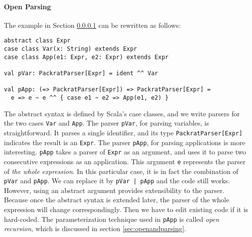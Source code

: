 \paragraph{Open Parsing}
The example in Section \ref{} can be rewritten as follows:

\begin{lstlisting}
abstract class Expr
case class Var(x: String) extends Expr
case class App(e1: Expr, e2: Expr) extends Expr

val pVar: PackratParser[Expr] = ident ^^ Var

val pApp: (=> PackratParser[Expr]) => PackratParser[Expr] =
  e => e ~ e ^^ { case e1 ~ e2 => App(e1, e2) }
\end{lstlisting}

The abstract syntax is defined by Scala's case classes, and 
we write parsers for the two cases \lstinline{Var} and \lstinline{App}.
The parser \lstinline{pVar}, for parsing variables, is straightforward. It parses a
single identifier, and its type \lstinline{PackratParser[Expr]}
indicates the result is an \lstinline{Expr}.
The parser \lstinline{pApp}, for parsing applications is more
interesting. \lstinline{pApp} takes a parser of
\lstinline{Expr} as an argument, and uses it to parse two consecutive
expressions as an application. This argument \lstinline{e} represents
the parser of \emph{the whole expression}. In this particular case, it
is in fact the combination of \lstinline{pVar} and
\lstinline{pApp}. We can replace it by \lstinline{pVar | pApp} and the
code still works. However, using an abstract argument provides
extensibility to the parser. Because once the abstract syntax is
extended later, the parser of the whole expression will change
correspondingly. Then we have to edit existing code if it is
hard-coded. The parameterization technique used in \lstinline{pApp} is
called \textit{open recursion}, which is discussed in section
\ref{sec:openandparsing}.

